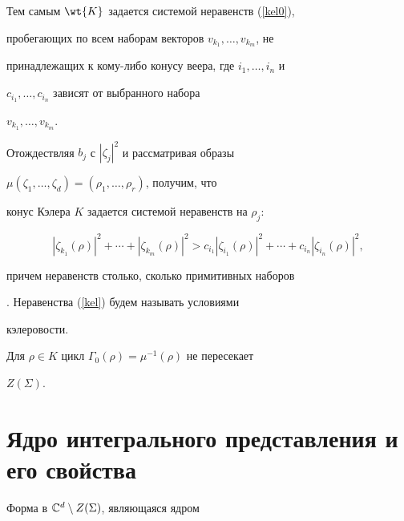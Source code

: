 Тем самым $\wt{K}$ задается системой неравенств (\ref{kel0}),


пробегающих по всем наборам векторов $v_{k_1},\dotsc,v_{k_m}$, не


принадлежащих к кому-либо конусу веера, где $i_1,\dotsc,i_n$ и


$c_{i_1},\dotsc,c_{i_n}$ зависят от выбранного набора 


$v_{k_1},\dotsc,v_{k_m}$.





Отождествляя $b_j$ с $|\zeta_j|^2$ и рассматривая образы


$\mu(\zeta_1,\dotsc,\zeta_d)=(\rho_1,\dotsc,\rho_r)$, получим, что


конус Кэлера $K$ задается системой неравенств на $\rho_j$:


\begin{equation}


|\zeta_{k_1}(\rho)|^2+\dotsb+|\zeta_{k_m}(\rho)|^2>


c_{i_1}|\zeta_{i_1}(\rho)|^2+\dotsb+c_{i_n}|\zeta_{i_n}(\rho)|^2,


\label{kel}


\end{equation}


причем неравенств столько, сколько примитивных наборов


\cite{Bat}. Неравенства (\ref{kel}) будем называть условиями


кэлеровости.








\begin{prop}


Для $\rho\in K$ цикл $\Gamma_0(\rho)=\mu^{-1}(\rho)$ не пересекает


$Z(\Sigma)$.


\end{prop}








\section{Ядро интегрального представления и его свойства}





Форма в $\Bbb{C}^d\setminus Z(\Sigma)$, являющаяся ядром


